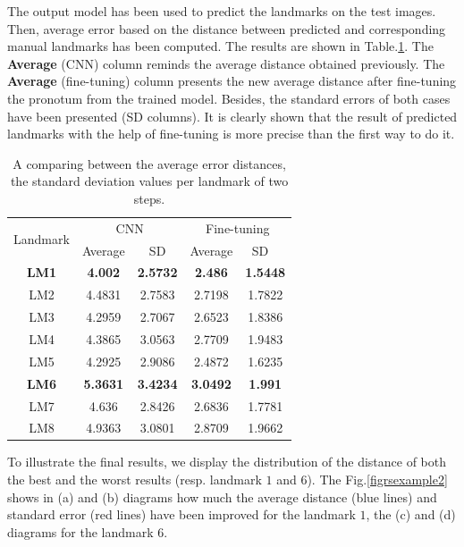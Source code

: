 \documentclass[10pt]{article}
\begin{document}
The output model has been used to predict the landmarks on the test
images. Then, average error based on the distance between
predicted and corresponding manual landmarks has been computed. The results
are shown in Table.\ref{tab2}. The \textbf{Average} (CNN) column reminds
the average distance obtained previously. The \textbf{Average} (fine-tuning)
column presents the new average distance
after fine-tuning the pronotum from the trained model. Besides, the standard errors of both cases have been presented (SD columns). It is
clearly shown that the result of predicted landmarks with the help of
fine-tuning is more precise than the first way to do it.

\begin{table}[htbp]
\centering
\begin{tabular}{ | c | c | c | c | c | }
\hline
	\multicolumn{1}{|c|}{\multirow{2}{*}{Landmark}} & \multicolumn{2}{c|}{CNN} &  \multicolumn{2}{c|}{Fine-tuning}  \\ \cline{2-5}
	 & Average & SD & Average & SD \  \\ \hline
	\textbf{LM1} & \textbf{4.002} & \textbf{2.5732} & \textbf{2.486} & \textbf{1.5448} \\ \hline
	LM2 & 4.4831 & 2.7583 & 2.7198 & 1.7822 \\ \hline
	LM3 & 4.2959 & 2.7067 & 2.6523 & 1.8386 \\ \hline
	LM4 & 4.3865 & 3.0563 & 2.7709 & 1.9483 \\ \hline
	LM5 & 4.2925 & 2.9086 & 2.4872 & 1.6235 \\ \hline
	\textbf{LM6} & \textbf{5.3631} & \textbf{3.4234} & \textbf{3.0492} & \textbf{1.991} \\ \hline
	LM7 & 4.636 & 2.8426 & 2.6836 & 1.7781 \\ \hline
	LM8 & 4.9363 & 3.0801 & 2.8709 & 1.9662 \\ \hline
\end{tabular}
\caption{\small{A comparing between the average error distances, the standard deviation values per landmark of two steps.}}
\label{tab2}
\end{table}

To illustrate the final results, we display the distribution of the
distance of both the best and the worst results (resp. landmark $1$
and $6$). The Fig.\ref{figrsexample2} shows in (a) and (b) diagrams
 how much the average distance (blue lines) and standard error (red lines) have
 been improved for the landmark $1$, the (c) and (d) diagrams for the
 landmark $6$.
\end{document}
